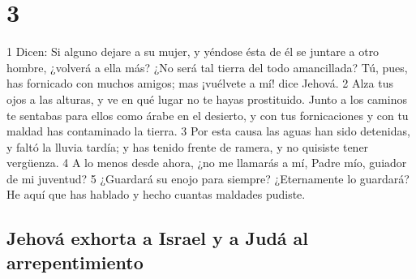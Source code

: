 \chapter{3}

1 Dicen: Si alguno dejare a su mujer, y yéndose ésta de él se juntare a otro hombre, ¿volverá a ella más? ¿No será tal tierra del todo amancillada? Tú, pues, has fornicado con muchos amigos; mas ¡vuélvete a mí! dice Jehová.
2 Alza tus ojos a las alturas, y ve en qué lugar no te hayas prostituido. Junto a los caminos te sentabas para ellos como árabe en el desierto, y con tus fornicaciones y con tu maldad has contaminado la tierra.
3 Por esta causa las aguas han sido detenidas, y faltó la lluvia tardía; y has tenido frente de ramera, y no quisiste tener vergüenza.
4 A lo menos desde ahora, ¿no me llamarás a mí, Padre mío, guiador de mi juventud?
5 ¿Guardará su enojo para siempre? ¿Eternamente lo guardará? He aquí que has hablado y hecho cuantas maldades pudiste.

\section*{Jehová exhorta a Israel y a Judá al arrepentimiento}

